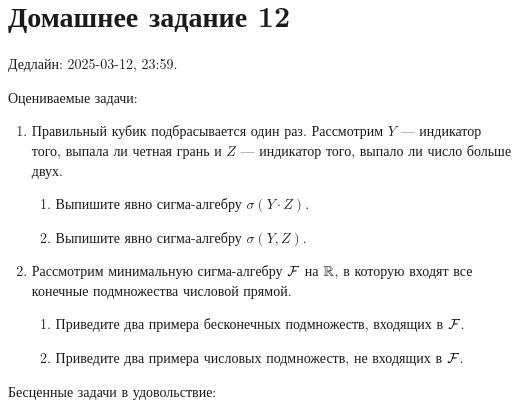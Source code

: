\section*{Домашнее задание 12}


Дедлайн: 2025-03-12, 23:59.

Оцениваемые задачи:

\begin{enumerate}

    
\item Правильный кубик подбрасывается один раз.
Рассмотрим $Y$ — индикатор того, выпала ли четная грань
и $Z$ — индикатор того, выпало ли число больше двух.
\begin{enumerate}
\item Выпишите явно сигма-алгебру $\sigma(Y\cdot Z)$.
\item Выпишите явно сигма-алгебру $\sigma(Y, Z)$.
\end{enumerate}


\item Рассмотрим минимальную сигма-алгебру $\mathcal{F}$ на $\mathbb{R}$, в которую входят все конечные подмножества числовой прямой. 
\begin{enumerate}
    \item Приведите два примера бесконечных подмножеств, входящих в $\mathcal{F}$.
    \item Приведите два примера числовых подмножеств, не входящих в $\mathcal{F}$.
\end{enumerate}


\end{enumerate}

Бесценные задачи в удовольствие:

